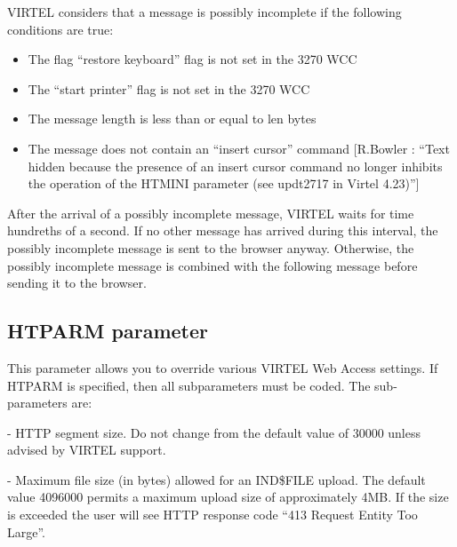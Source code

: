 \documentclass[letterpaper,10pt,english]{sphinxmanual}
\begin{document}
VIRTEL considers that a message is possibly incomplete if the following conditions are true:
\begin{itemize}
\item {} 
The flag “restore keyboard” flag is not set in the 3270 WCC

\item {} 
The “start printer” flag is not set in the 3270 WCC

\item {} 
The message length is less than or equal to len bytes

\item {} 
The message does not contain an “insert cursor” command {[}R.Bowler : “Text hidden because the presence of an insert cursor command no longer inhibits the operation of the HTMINI parameter (see updt2717 in Virtel 4.23)”{]}

\end{itemize}

After the arrival of a possibly incomplete message, VIRTEL waits for time hundreths of a second. If no other message has arrived during this interval, the possibly incomplete message is sent to the browser anyway. Otherwise, the possibly incomplete message is combined with the following message before sending it to the browser.


\subsection{HTPARM parameter}
\label{\detokenize{Installation_Guide:htparm-parameter}}\label{\detokenize{Installation_Guide:index-78}}
\begin{sphinxVerbatim}[commandchars=\\\{\}]
                 
\end{sphinxVerbatim}

This parameter allows you to override various VIRTEL Web Access settings. If HTPARM is specified, then all subparameters must be coded. The sub-parameters are:

 - HTTP segment size. Do not change from the default value of 30000 unless advised by VIRTEL support.

 - Maximum file size (in bytes) allowed for an IND\$FILE upload. The default value 4096000 permits a maximum upload size of approximately 4MB. If the size is exceeded the user will see HTTP response code “413 Request Entity Too Large”.
\end{document}
